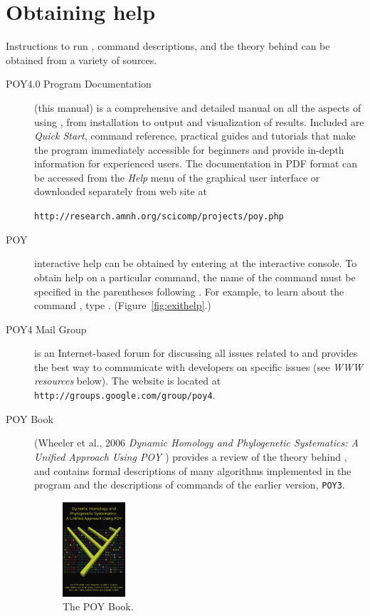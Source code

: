 \section{Obtaining help} \label{sec:help}
Instructions to run \poy, command descriptions, and the theory behind \poy can be obtained from a variety of sources.
\begin{description}
\item[POY4.0 Program Documentation] (this manual) is a comprehensive and detailed manual on all the aspects of using \poy, from installation to output and visualization of results. Included are \emph{Quick Start}, \poy command reference, practical guides and tutorials that make the program immediately accessible for beginners and provide in-depth information for experienced users. The documentation in PDF format can be accessed from the \emph{Help} menu of the graphical user interface or downloaded separately from \poy web site at
\begin{center}
\texttt{http://research.amnh.org/scicomp/projects/poy.php}
\end{center}
\item[POY] interactive help can be obtained by entering  at the \poy interactive console. To obtain help on a particular command, the name of the command must be specified in the parentheses following . For example, to learn about the command , type . (Figure~\ref{fig:exithelp}.)
\item[POY4 Mail Group] is an Internet-based forum for discussing all issues related to \poy and provides the best way to communicate with \poy developers on specific issues (see \emph{WWW resources} below). The website is located at \texttt{http://groups.google.com/group/poy4}.
\item[POY Book] (Wheeler et al., 2006 \emph{Dynamic Homology and Phylogenetic Systematics: A Unified Approach Using POY \cite{wheeleretal2006}}) provides a review of the theory behind \poy, and contains formal descriptions of many algorithms implemented in the program and the descriptions of commands of the earlier version, \texttt{POY3}.
\begin{figure}[htbp]
   \centering
   \includegraphics[width=0.23\textwidth]{figures/figpoybook.jpg}
   \caption{The POY Book.}
   \label{fig:figprocess}
\end{figure}
\end{description}

